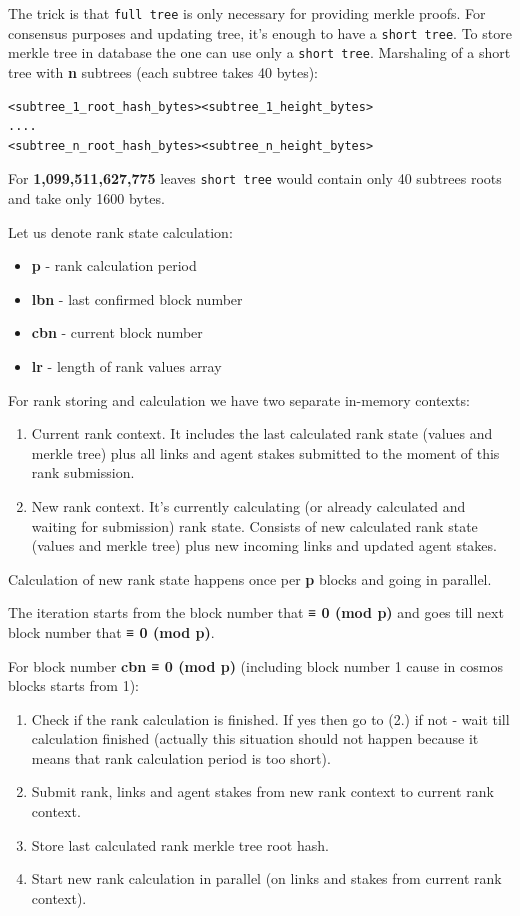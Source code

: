 \documentclass[10pt,oneside]{amsart}
\newcommand{\code}[1]{\textbf{#1}}
\begin{document}
The trick is that \verb|full tree| is only necessary for providing merkle proofs.
For consensus purposes and updating tree, it's enough to have a \verb|short tree|.
To store merkle tree in database the one can use only a \verb|short tree|. Marshaling of a short tree with \code{n} subtrees (each subtree takes 40 bytes):  

\begin{lstlisting}
<subtree_1_root_hash_bytes><subtree_1_height_bytes>
....
<subtree_n_root_hash_bytes><subtree_n_height_bytes>
\end{lstlisting}

For \code{1,099,511,627,775} leaves \verb|short tree| would contain only 40 subtrees roots and take only 1600 bytes.

Let us denote rank state calculation:

\begin{itemize}
    \item[] \code{p} - rank calculation period 
    \item[] \code{lbn} - last confirmed block number  
    \item[] \code{cbn} - current block number  
    \item[] \code{lr} -  length of rank values array  
\end{itemize}

For rank storing and calculation we have two separate in-memory contexts:

\begin{enumerate}
\item Current rank context. It includes the last calculated rank state (values and merkle tree) plus
all links and agent stakes submitted to the moment of this rank submission.
\item New rank context. It's currently calculating (or already calculated and waiting for submission) rank state. Consists of new calculated rank state (values and merkle tree) plus new incoming links and updated agent stakes.
\end{enumerate}

Calculation of new rank state happens once per \code{p} blocks and going in parallel.

The iteration starts from the block number that \code{≡ 0 (mod p)} and goes till next block number that \code{≡ 0 (mod p)}.

For block number \code{cbn ≡ 0 (mod p)} (including block number 1 cause in cosmos blocks starts from 1):

\begin{enumerate}
  \item Check if the rank calculation is finished. If yes then go to (2.) if not - wait till calculation finished
  (actually this situation should not happen because it means that rank calculation period is too short).
  \item Submit rank, links and agent stakes from new rank context to current rank context.
  \item Store last calculated rank merkle tree root hash.
  \item Start new rank calculation in parallel (on links and stakes from current rank context).
\end{enumerate}
\end{document}
